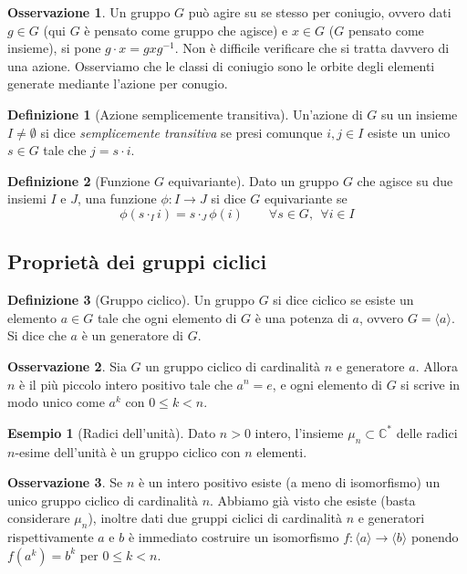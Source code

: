\documentclass[11pt]{article}
\theoremstyle{plain}
\theoremstyle{definition}
\newtheorem{defn}{Definizione}[section]
\newtheorem{exmp}{Esempio}[section]
\newtheorem*{rem}{Osservazione}
\theoremstyle{remark}
\newcommand{\C}{\mathbb{C}}
\begin{document}
\begin{rem}
	Un gruppo $G$ può agire su se stesso per coniugio, ovvero dati $g\in G$ (qui $G$ è pensato come gruppo che agisce) e $x\in G$ ($G$ pensato come insieme),
	si pone $g\cdot x = gxg^{-1}$. Non è difficile verificare che si tratta davvero di una azione.
	Osserviamo che le classi di coniugio sono le orbite degli elementi generate mediante l'azione per conugio.
\end{rem}




\begin{defn}[Azione semplicemente transitiva]
Un'azione di $G$ su un insieme $I\neq \emptyset$ si dice \textit{semplicemente transitiva}
se presi comunque $i,j\in I$ esiste un unico $s\in G$ tale che $j=s\cdot i$.
\end{defn}


\begin{defn}[Funzione $G$ equivariante]
Dato un gruppo $G$ che agisce su due insiemi $I$ e $J$, una funzione $\phi: I \to J$ si dice $G$ equivariante se 
\[ \phi(s \cdot_I i) = s \cdot_J \phi(i) \qquad \forall s \in G, \ \ \forall i \in I \]
\end{defn}





\newpage
\subsection{Proprietà dei gruppi ciclici}

\begin{defn}[Gruppo ciclico] Un gruppo $G$ si dice ciclico se esiste un elemento $a\in G$ tale che ogni
elemento di $G$ è una potenza di $a$, ovvero $G=\langle a\rangle$. Si dice che $a$ è un generatore di $G$.
\end{defn}

\begin{rem}
Sia $G$ un gruppo ciclico di cardinalità $n$ e generatore $a$. Allora $n$ è il più piccolo intero positivo tale che $a^n = e$,
e ogni elemento di $G$ si scrive in modo unico come $a^k$ con $0\le k < n$.
\end{rem}

\begin{exmp}[Radici dell'unità]
Dato $n>0$ intero, l'insieme $\mu_n\subset \C^*$ delle radici $n$-esime dell'unità è un gruppo ciclico con $n$ elementi.
\end{exmp}

\begin{rem} Se $n$ è un intero positivo esiste (a meno di isomorfismo) un unico gruppo ciclico di cardinalità $n$.
Abbiamo già visto che esiste (basta considerare $\mu_n$),
inoltre dati due gruppi ciclici di cardinalità $n$ e generatori rispettivamente $a$ e $b$ è immediato costruire un
isomorfismo $f:\langle a\rangle\to\langle b\rangle$ ponendo $f(a^k) = b^k$ per $0\le k < n$.
\end{rem}
\end{document}
